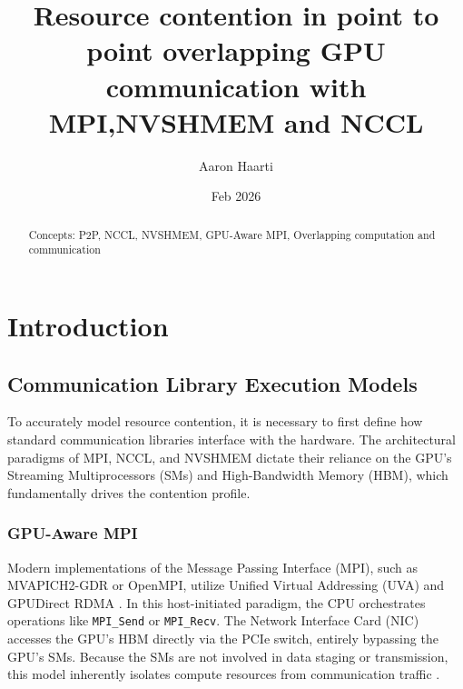 \documentclass[twocolumn, secnumarabic, amssymb, nobibnotes, aps, prd, amsmath, nofootinbib]{revtex4-2}
\begin{document}
\title{Resource contention in point to point overlapping GPU communication with MPI,NVSHMEM and NCCL}
\author{Aaron Haarti}


\date{Feb 2026}

\begin{abstract}
Concepts: P2P, NCCL, NVSHMEM, GPU-Aware MPI, Overlapping computation and communication
\end{abstract}

\maketitle

\section{Introduction}\label{sect:introduction}

\subsection{Communication Library Execution Models}

To accurately model resource contention, it is necessary to first define how standard communication libraries interface with the hardware. The architectural paradigms of MPI, NCCL, and NVSHMEM dictate their reliance on the GPU's Streaming Multiprocessors (SMs) and High-Bandwidth Memory (HBM), which fundamentally drives the contention profile.

\subsubsection{GPU-Aware MPI}
Modern implementations of the Message Passing Interface (MPI), such as MVAPICH2-GDR or OpenMPI, utilize Unified Virtual Addressing (UVA) and GPUDirect RDMA \cite{potluri2013mvapich2, nvidia_gpudirect}. In this host-initiated paradigm, the CPU orchestrates operations like \texttt{MPI\_Send} or \texttt{MPI\_Recv}. The Network Interface Card (NIC) accesses the GPU's HBM directly via the PCIe switch, entirely bypassing the GPU's SMs. Because the SMs are not involved in data staging or transmission, this model inherently isolates compute resources from communication traffic \cite{chu2020exploiting}.
\end{document}
